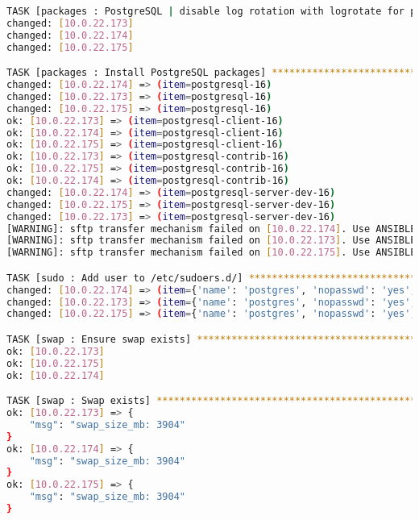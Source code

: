 \begin{flushleft}
\begin{lstlisting}[language=bash, caption=Deploy - Anhang - Deployt,captionpos=b,label={lst:deploy-appendix-deployt},breaklines=true]
TASK [packages : PostgreSQL | disable log rotation with logrotate for postgresql] *********************************************************************************************************************************
changed: [10.0.22.173]
changed: [10.0.22.174]
changed: [10.0.22.175]

TASK [packages : Install PostgreSQL packages] *********************************************************************************************************************************************************************
changed: [10.0.22.174] => (item=postgresql-16)
changed: [10.0.22.173] => (item=postgresql-16)
changed: [10.0.22.175] => (item=postgresql-16)
ok: [10.0.22.173] => (item=postgresql-client-16)
ok: [10.0.22.174] => (item=postgresql-client-16)
ok: [10.0.22.175] => (item=postgresql-client-16)
ok: [10.0.22.173] => (item=postgresql-contrib-16)
ok: [10.0.22.175] => (item=postgresql-contrib-16)
ok: [10.0.22.174] => (item=postgresql-contrib-16)
changed: [10.0.22.174] => (item=postgresql-server-dev-16)
changed: [10.0.22.175] => (item=postgresql-server-dev-16)
changed: [10.0.22.173] => (item=postgresql-server-dev-16)
[WARNING]: sftp transfer mechanism failed on [10.0.22.174]. Use ANSIBLE_DEBUG=1 to see detailed information
[WARNING]: sftp transfer mechanism failed on [10.0.22.173]. Use ANSIBLE_DEBUG=1 to see detailed information
[WARNING]: sftp transfer mechanism failed on [10.0.22.175]. Use ANSIBLE_DEBUG=1 to see detailed information

TASK [sudo : Add user to /etc/sudoers.d/] *************************************************************************************************************************************************************************
changed: [10.0.22.174] => (item={'name': 'postgres', 'nopasswd': 'yes', 'commands': 'ALL'})
changed: [10.0.22.173] => (item={'name': 'postgres', 'nopasswd': 'yes', 'commands': 'ALL'})
changed: [10.0.22.175] => (item={'name': 'postgres', 'nopasswd': 'yes', 'commands': 'ALL'})

TASK [swap : Ensure swap exists] **********************************************************************************************************************************************************************************
ok: [10.0.22.173]
ok: [10.0.22.175]
ok: [10.0.22.174]

TASK [swap : Swap exists] *****************************************************************************************************************************************************************************************
ok: [10.0.22.173] => {
    "msg": "swap_size_mb: 3904"
}
ok: [10.0.22.174] => {
    "msg": "swap_size_mb: 3904"
}
ok: [10.0.22.175] => {
    "msg": "swap_size_mb: 3904"
}


\end{lstlisting}
\end{flushleft}
